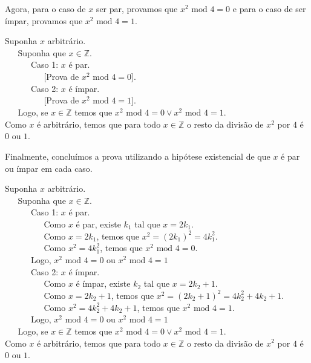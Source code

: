 \begin{Example}
Agora, para o caso de $x$ ser par, provamos que $x^2\text{ mod }4 = 0$
e para o caso de ser ímpar, provamos que $x^2\text{ mod }4 = 1$.
\begin{flushleft}
Suponha $x$ arbitrário.\\
\verb|   |Suponha que $x\in\mathbb{Z}$.\\
\verb|      |Caso 1: $x$ é par.\\
\verb|         |[Prova de $x^2\text{ mod }4 = 0$].\\
\verb|      |Caso 2: $x$ é ímpar.\\
\verb|         |[Prova de $x^2\text{ mod }4 = 1$].\\
\verb|   |Logo, se $x\in\mathbb{Z}$ temos que  $x^2\text{ mod }4 = 0 \lor
x^2\text{ mod }4 = 1$.\\
Como $x$ é arbitrário, temos que para todo $x\in\mathbb{Z}$ o resto da divisão de $x^2$ por $4$ é $0$
ou $1$.
\end{flushleft}
Finalmente, concluímos a prova utilizando a hipótese existencial de
que $x$ é par ou ímpar em cada caso.
\begin{flushleft}
Suponha $x$ arbitrário.\\
\verb|   |Suponha que $x\in\mathbb{Z}$.\\
\verb|      |Caso 1: $x$ é par.\\
\verb|         |Como $x$ é par, existe $k_1$ tal que $x = 2k_1$.\\
\verb|         |Como $x = 2k_1$, temos que $x^2 = (2k_1)^2 = 4k_1^2$.\\
\verb|         |Como $x^2 = 4k_1^2$, temos que $x^2\text{ mod }4 =
0$.\\
\verb|      |Logo, $x^2\text{ mod }4 = 0$ ou $x^2\text{ mod }4 = 1$\\
\verb|      |Caso 2: $x$ é ímpar.\\
\verb|         |Como $x$ é ímpar, existe $k_2$ tal que $x = 2k_2+1$.\\
\verb|         |Como $x = 2k_2 + 1$, temos que $x^2 = (2k_2 + 1)^2 =
4k_2^2 + 4k_2 + 1$.\\
\verb|         |Como $x^2 = 4k_2^2 + 4k_2 + 1$, temos que $x^2\text{ mod }4 =
1$.\\
\verb|      |Logo, $x^2\text{ mod }4 = 0$ ou $x^2\text{ mod }4 = 1$\\
\verb|   |Logo, se $x\in\mathbb{Z}$ temos que  $x^2\text{ mod }4 = 0 \lor
x^2\text{ mod }4 = 1$.\\
Como $x$ é arbitrário, temos que para todo $x\in\mathbb{Z}$ o resto da divisão de $x^2$ por $4$ é $0$
ou $1$.
\end{flushleft}
\end{Example}
